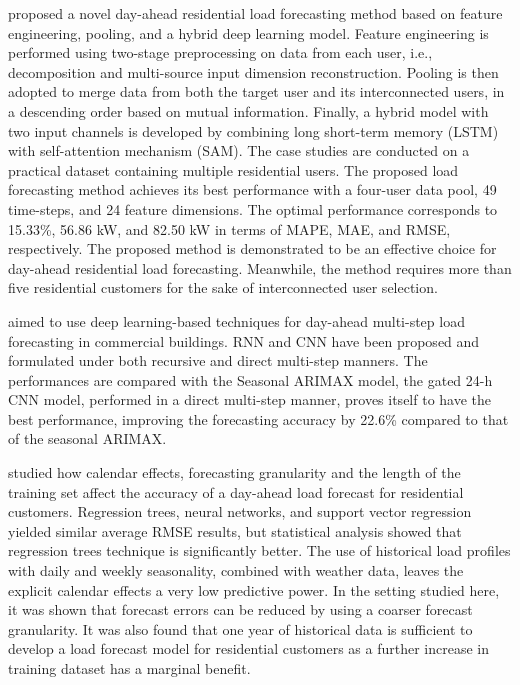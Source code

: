 \cite{ZANG2021120682} proposed a novel day-ahead residential load forecasting method based on feature engineering, pooling, and a hybrid deep learning model.
Feature engineering is performed using two-stage preprocessing on data from each user, i.e., decomposition and multi-source input dimension reconstruction.
Pooling is then adopted to merge data from both the target user and its interconnected users, in a descending order based on mutual information.
Finally, a hybrid model with two input channels is developed by combining long short-term memory (LSTM) with self-attention mechanism (SAM).
The case studies are conducted on a practical dataset containing multiple residential users.
The proposed load forecasting method achieves its best performance with a four-user data pool, 49 time-steps, and 24 feature dimensions.
The optimal performance corresponds to 15.33\%, 56.86 kW, and 82.50 kW in terms of MAPE, MAE, and RMSE, respectively.
The proposed method is demonstrated to be an effective choice for day-ahead residential load forecasting. Meanwhile, the method requires more than five residential customers for the sake of interconnected user selection.

\cite{CAI20191078} aimed to use deep learning-based techniques for day-ahead multi-step load forecasting in commercial buildings.
RNN and CNN have been proposed and formulated under both recursive and direct multi-step manners.
The performances are compared with the Seasonal ARIMAX model, the gated 24-h CNN model, performed in a direct multi-step manner, proves itself to have the best performance, improving the forecasting accuracy by 22.6\% compared to that of the seasonal ARIMAX.

\cite{LUSIS2017654} studied how calendar effects, forecasting granularity and the length of the training set affect the accuracy of a day-ahead load forecast for residential customers.
Regression trees, neural networks, and support vector regression yielded similar average RMSE results, but statistical analysis showed that regression trees technique is significantly better.
The use of historical load profiles with daily and weekly seasonality, combined with weather data, leaves the explicit calendar effects a very low predictive power.
In the setting studied here, it was shown that forecast errors can be reduced by using a coarser forecast granularity.
It was also found that one year of historical data is sufficient to develop a load forecast model for residential customers as a further increase in training dataset has a marginal benefit.

